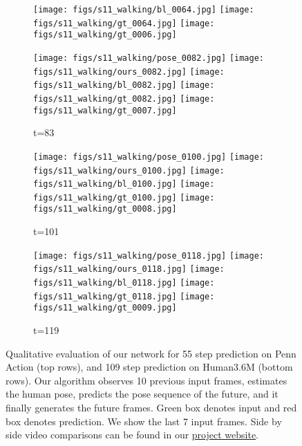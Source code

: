 \documentclass{article}
\begin{document}
\begin{figure*}[thbp]
\begin{subfigure}{0.12\linewidth}
  		\texttt{[image: figs/s11\_walking/bl\_0064.jpg]}
  		\texttt{[image: figs/s11\_walking/gt\_0064.jpg]}
  		\texttt{[image: figs/s11\_walking/gt\_0006.jpg]}
	\end{subfigure}
	\begin{subfigure}{0.12\linewidth}
        \caption*{t=83}
        \vspace{-7pt}
	    \texttt{[image: figs/s11\_walking/pose\_0082.jpg]} 
  		\texttt{[image: figs/s11\_walking/ours\_0082.jpg]}
  		\texttt{[image: figs/s11\_walking/bl\_0082.jpg]}
  		\texttt{[image: figs/s11\_walking/gt\_0082.jpg]}
  		\texttt{[image: figs/s11\_walking/gt\_0007.jpg]}
	\end{subfigure}
	\begin{subfigure}{0.12\linewidth}
        \caption*{t=101}
        \vspace{-7pt}
	    \texttt{[image: figs/s11\_walking/pose\_0100.jpg]} 
  		\texttt{[image: figs/s11\_walking/ours\_0100.jpg]}
  		\texttt{[image: figs/s11\_walking/bl\_0100.jpg]}
  		\texttt{[image: figs/s11\_walking/gt\_0100.jpg]}
  		\texttt{[image: figs/s11\_walking/gt\_0008.jpg]}
	\end{subfigure}
	\begin{subfigure}{0.12\linewidth}
        \caption*{t=119}
        \vspace{-7pt}
	    \texttt{[image: figs/s11\_walking/pose\_0118.jpg]} 
  		\texttt{[image: figs/s11\_walking/ours\_0118.jpg]}
  		\texttt{[image: figs/s11\_walking/bl\_0118.jpg]}
  		\texttt{[image: figs/s11\_walking/gt\_0118.jpg]}
  		\texttt{[image: figs/s11\_walking/gt\_0009.jpg]}
	\end{subfigure}
    \vspace{-5pt}

    \caption{Qualitative evaluation of our network for 55 step prediction on Penn Action (top rows), and 109 step prediction on Human3.6M (bottom rows). Our algorithm observes 10 previous input frames, estimates the human pose, predicts the pose sequence of the future, and it finally generates the future frames. Green box denotes input and red box denotes prediction. We show the last 7 input frames. Side by side video comparisons can be found in our \href{https://goo.gl/U7UOfy}{project website}.}
\label{fig:qualitative}
\end{figure*}
\end{document}
